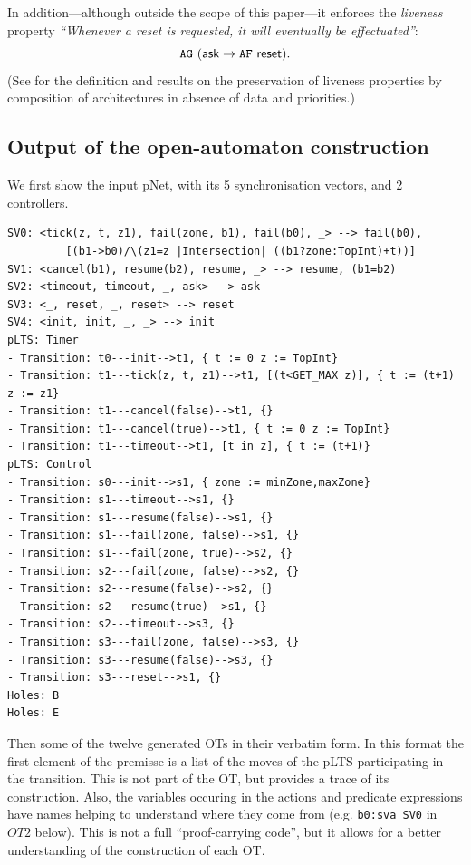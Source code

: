 \documentclass{llncs}
\makeatletter
\newcommand{\mdash}[1][]{---#1}
\newcommand{\AG}[1][\ ]{\ensuremath{\mathtt{AG}#1}}
\newcommand{\AF}[1][\ ]{\ensuremath{\mathtt{AF}#1}}
\newcommand{\verbatimfont}[1]{\renewcommand{\verbatim@font}{\ttfamily#1}}
\makeatother
\begin{document}
In addition\mdash although outside the scope of this paper\mdash it
enforces the \emph{liveness} property \emph{``Whenever a reset is
  requested, it will eventually be effectuated''}:
%
  \begin{equation}
    \label{eq:prop:reset:will}
    \AG (\PortAsk \rightarrow \AF \PortReset).
  \end{equation}
%
  (See \cite{AttieBBJS16-architectures-faoc} for the definition and
  results on the preservation of liveness properties by composition of
  architectures in absence of data and priorities.)


\subsection{Output of the open-automaton construction}
\label{secn:full-results}



We first show the input pNet, with its 5 synchronisation vectors, and 2 controllers.

\noindent
\verbatimfont{\small}
\begin{verbatim}
SV0: <tick(z, t, z1), fail(zone, b1), fail(b0), _> --> fail(b0),
         [(b1->b0)/\(z1=z |Intersection| ((b1?zone:TopInt)+t))]
SV1: <cancel(b1), resume(b2), resume, _> --> resume, (b1=b2)
SV2: <timeout, timeout, _, ask> --> ask
SV3: <_, reset, _, reset> --> reset
SV4: <init, init, _, _> --> init
pLTS: Timer
- Transition: t0---init-->t1, { t := 0 z := TopInt}
- Transition: t1---tick(z, t, z1)-->t1, [(t<GET_MAX z)], { t := (t+1) z := z1}
- Transition: t1---cancel(false)-->t1, {}
- Transition: t1---cancel(true)-->t1, { t := 0 z := TopInt}
- Transition: t1---timeout-->t1, [t in z], { t := (t+1)}
pLTS: Control
- Transition: s0---init-->s1, { zone := minZone,maxZone}
- Transition: s1---timeout-->s1, {}
- Transition: s1---resume(false)-->s1, {}
- Transition: s1---fail(zone, false)-->s1, {}
- Transition: s1---fail(zone, true)-->s2, {}
- Transition: s2---fail(zone, false)-->s2, {}
- Transition: s2---resume(false)-->s2, {}
- Transition: s2---resume(true)-->s1, {}
- Transition: s2---timeout-->s3, {}
- Transition: s3---fail(zone, false)-->s3, {}
- Transition: s3---resume(false)-->s3, {}
- Transition: s3---reset-->s1, {}
Holes: B
Holes: E
\end{verbatim}

Then some of the twelve generated OTs in their verbatim form. In this format
the first element of the premisse is a list of the moves of the pLTS
participating in the transition. This is not part of the OT, but
provides a trace of its construction. Also, the variables occuring in
the actions and predicate expressions have names helping to understand
where they come from (e.g. \verb|b0:sva_SV0| in $OT2$ below).
This is not a full ``proof-carrying
code'', but it allows for a better understanding of the construction
of each OT.
\end{document}

